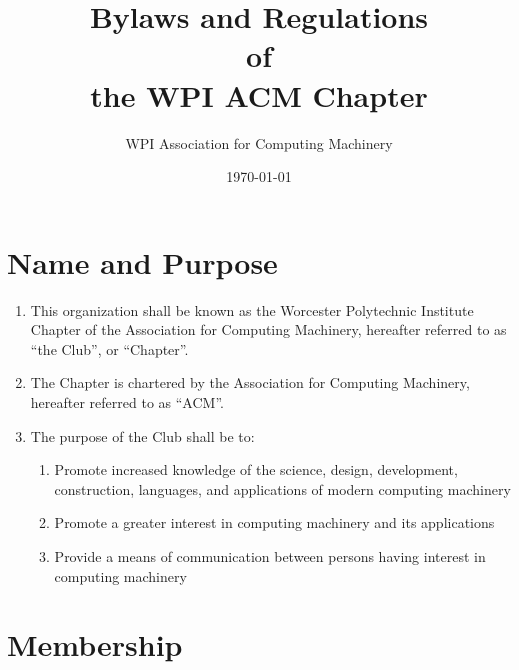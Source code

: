\documentclass[12pt, letterpaper, oneside]{book}
\title{Bylaws and Regulations \\ of \\ the WPI ACM Chapter}
\author{WPI Association for Computing Machinery}
\date{\today}
\begin{document}
\maketitle

\tableofcontents
\newpage

\renewcommand{\chaptername}{Article}

\chapter{Name and Purpose}
\begin{enumerate}
    \item This organization shall be known as the Worcester Polytechnic
        Institute Chapter of the Association for Computing Machinery, hereafter
        referred to as ``the Club'', or ``Chapter''.
    \item The Chapter is chartered by the Association for Computing Machinery,
        hereafter referred to as ``ACM''.
    \item The purpose of the Club shall be to:
        \begin{enumerate}
            \item Promote increased knowledge of the science, design,
                development, construction, languages, and applications of modern
                computing machinery
            \item Promote a greater interest in computing machinery and its
                applications
            \item Provide a means of communication between persons having
                interest in computing machinery
        \end{enumerate}
\end{enumerate}

\chapter{Membership}
\end{document}
